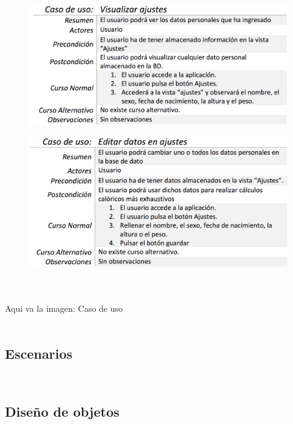 \documentclass[a4paper, 11pt]{article}
\begin{document}
\begin{itemize}
            \begin{figure}[H]
              \centering
              \includegraphics[width=1\textwidth]{visualizar-ajustes}
            \end{figure}

            \begin{figure}[H]
              \centering
              \includegraphics[width=1\textwidth]{editar-datos-en-ajustes}
            \end{figure}

          \\\\\textcolor[rgb]{1,0,0}{Aqui va la imagen: Caso de uso}\\\\

       \subsection{Escenarios}\\

       \subsection{Diseño de objetos}\\


\end{itemize}
\end{document}
